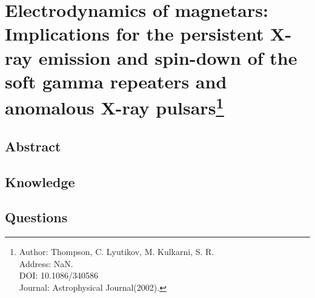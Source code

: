 \section[Electrodynamics of magnetars: Implications for the persistent X-ray emission and spin-down of the soft gamma repeaters and anomalous X-ray pulsars]{Electrodynamics of magnetars: Implications for the persistent X-ray emission and spin-down of the soft gamma repeaters and anomalous X-ray pulsars\protect\footnote{Author: Thompson, C. Lyutikov, M. Kulkarni, S. R. \\Address: NaN. \\DOI: 10.1086/340586 \\Journal: Astrophysical Journal(2002).}}
\subsection{Abstract}

\subsection{Knowledge}

\subsection{Questions}